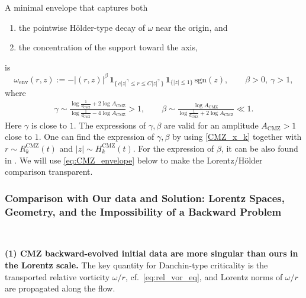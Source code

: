 \documentclass[reqno,11pt]{amsart}
\begin{document}
A minimal envelope that captures both
\begin{enumerate}
\item the pointwise H\"older-type decay of $\omega$ near the origin, and
\item the concentration of the support toward the axis,
\end{enumerate}
is
\begin{equation}\label{eq:CMZ_envelope}
\omega_{\mathrm{env}}(r,z)
:=
-|(r,z)|^{\beta}\,
\mathbf{1}_{\{\,c|z|^{\gamma}\le r\le C|z|^{\gamma}\,\}}\,
\mathbf{1}_{\{|z|\le 1\}}\,
\mathrm{sgn}(z),
\qquad
\beta>0,\ \gamma>1,
\end{equation}
where 
    \begin{align*}
        \gamma \sim \frac{\log \frac{1}{d_{\mathrm{CMZ}}}+2\log A_{\mathrm{CMZ}}}{\log \frac{1}{d_{\mathrm{CMZ}}}-4\log A_{\mathrm{CMZ}}}>1, 
    \qquad
        \beta\sim  \frac{\log A_{\mathrm{CMZ}}}{\log \frac{1}{d_{\mathrm{CMZ}}} +2\log A_{\mathrm{CMZ}}} \ll1.
    \end{align*}
Here $\gamma$ is close to $1.$ The expressions of $\gamma, \beta$ are valid for an amplitude $A_{\mathrm{CMZ}}>1$ close to $1.$
One can find the expression of $\gamma,\beta$ by using \eqref{CMZ_x_k} together with $r\sim R_k^{\mathrm{CMZ}}(t)$  and $|z|\sim H_k^{\mathrm{CMZ}}(t)$. For the expression of $\beta$, it can be also found in  \cite[\S~1.3.2]{CordobaMartinezZheng25}. 
 We will use \eqref{eq:CMZ_envelope} below to make the Lorentz/H\"older comparison
transparent.


\subsubsection{Comparison with Our data and Solution: Lorentz Spaces, Geometry, and the Impossibility of a Backward Problem} \,
\label{subsub:comparison} 

\medskip
\noindent\textbf{(1) CMZ backward-evolved initial data are more singular than ours in the Lorentz scale.}
The key quantity for Danchin-type criticality is the transported relative vorticity $\omega/r$,
cf.\ \eqref{eq:rel_vor_eq}, and Lorentz norms of $\omega/r$ are propagated along the flow.
\end{document}
